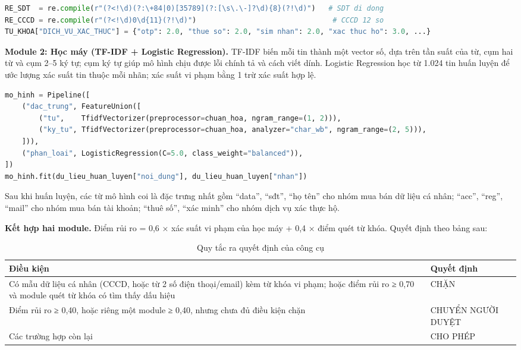 \begin{lstlisting}[language=Python, caption={Biểu thức chính quy và bộ từ khóa (trích)}]
RE_SDT  = re.compile(r"(?<!\d)(?:\+84|0)[35789](?:[\s\.\-]?\d){8}(?!\d)")   # SDT di dong
RE_CCCD = re.compile(r"(?<!\d)0\d{11}(?!\d)")                                # CCCD 12 so
TU_KHOA["DICH_VU_XAC_THUC"] = {"otp": 2.0, "thue so": 2.0, "sim nhan": 2.0, "xac thuc ho": 3.0, ...}
\end{lstlisting}

\textbf{Module 2: Học máy (TF-IDF + Logistic Regression).} TF-IDF biến mỗi tin thành một vector số, dựa trên tần suất của từ, cụm hai từ và cụm 2–5 ký tự; cụm ký tự giúp mô hình chịu được lỗi chính tả và cách viết dính. Logistic Regression học từ 1.024 tin huấn luyện để ước lượng xác suất tin thuộc mỗi nhãn; xác suất vi phạm bằng 1 trừ xác suất hợp lệ.

\begin{lstlisting}[language=Python, caption={Mô hình TF-IDF kết hợp Logistic Regression}]
mo_hinh = Pipeline([
    ("dac_trung", FeatureUnion([
        ("tu",    TfidfVectorizer(preprocessor=chuan_hoa, ngram_range=(1, 2))),
        ("ky_tu", TfidfVectorizer(preprocessor=chuan_hoa, analyzer="char_wb", ngram_range=(2, 5))),
    ])),
    ("phan_loai", LogisticRegression(C=5.0, class_weight="balanced")),
])
mo_hinh.fit(du_lieu_huan_luyen["noi_dung"], du_lieu_huan_luyen["nhan"])
\end{lstlisting}

Sau khi huấn luyện, các từ mô hình coi là đặc trưng nhất gồm “data”, “sđt”, “họ tên” cho nhóm mua bán dữ liệu cá nhân; “acc”, “reg”, “mail” cho nhóm mua bán tài khoản; “thuê số”, “xác minh” cho nhóm dịch vụ xác thực hộ.

\textbf{Kết hợp hai module.} Điểm rủi ro = 0,6 × xác suất vi phạm của học máy + 0,4 × điểm quét từ khóa. Quyết định theo bảng sau:

{\small{}
\begin{table}[H]
\centering
\caption{Quy tắc ra quyết định của công cụ}\label{tab:5.7}
\begin{tabularx}{\textwidth}{>{\hsize=1.506\hsize\raggedright\arraybackslash}X>{\hsize=0.494\hsize\raggedright\arraybackslash}X}
\toprule
\textbf{Điều kiện} & \textbf{Quyết định} \\
\midrule
Có mẫu dữ liệu cá nhân (CCCD, hoặc từ 2 số điện thoại/email) kèm từ khóa vi phạm; hoặc điểm rủi ro ≥ 0,70 và module quét từ khóa có tìm thấy dấu hiệu & CHẶN \\
Điểm rủi ro ≥ 0,40, hoặc riêng một module ≥ 0,40, nhưng chưa đủ điều kiện chặn & CHUYỂN NGƯỜI DUYỆT \\
Các trường hợp còn lại & CHO PHÉP \\
\bottomrule
\end{tabularx}
\end{table}}

